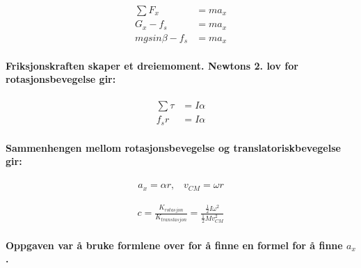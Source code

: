 \documentclass[12pt]{article}
\begin{document}
\begin{align}
    \sum F_x &= ma_x \nonumber \\
    G_x - f_s &= ma_x \nonumber \\
    m g sin \beta - f_s &= m a_x
\end{align}

\paragraph{Friksjonskraften skaper et dreiemoment. Newtons 2. lov for rotasjonsbevegelse gir:}

\begin{align}
    \sum \tau &= I\alpha \nonumber \\
    f_s r &= I \alpha
\end{align}

\paragraph{Sammenhengen mellom rotasjonsbevegelse og translatoriskbevegelse gir:}

\begin{align}
    a_x = \alpha r, \hspace{10pt} v_{CM} = \omega r
\end{align}

\begin{align}
    c = \frac{K_{rotasjon}}{K_{translasjon}} = \frac{\frac{1}{2} I \omega^2}{\frac{1}{2} M v_{CM}^2}
\end{align}

\paragraph{Oppgaven var å bruke formlene over for å finne en formel for å finne $a_x$.}
\end{document}
